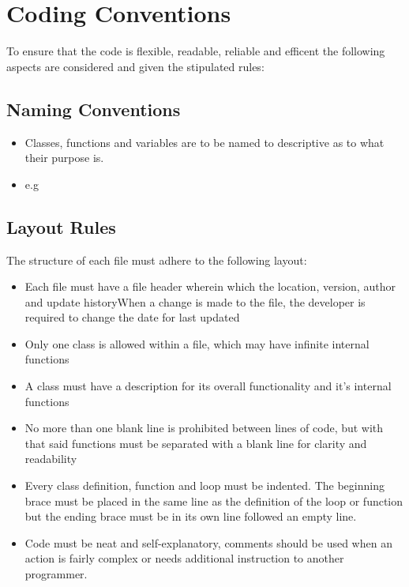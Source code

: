 \documentclass[12pt,a4paper]{article}
\begin{document}
	\section*{Coding Conventions}
	To ensure that the code is flexible, readable, reliable and efficent the following aspects are considered and given the stipulated rules:	
	
	\subsection*{Naming Conventions}
		\begin{itemize}
			\item Classes, functions and variables are to be named to descriptive as to what their purpose is.
			\item e.g
		\end{itemize}		
	
	\subsection*{Layout Rules}
	The structure of each file must adhere to the following  layout:
		\begin{itemize}
			\item Each file must have a file header wherein which the location, version, author and update history\newline When a change is made to the file, the developer is required to change the date for last updated
			\item Only one class is allowed within a file, which may have infinite internal functions
			\item A class must have a description for its overall functionality and it's internal functions
			\item No more than one blank line is prohibited between lines of code, but with that said functions must be separated with a blank line for clarity and readability
			\item Every class definition, function and loop must be indented. The beginning brace must be placed in the same line as the definition of the loop or function but the ending brace must be in its own line followed an empty line.
			\item Code must be neat and self-explanatory, comments should be used when an action is fairly
complex or needs additional instruction to another programmer.
		\end{itemize}
		
\end{document}
